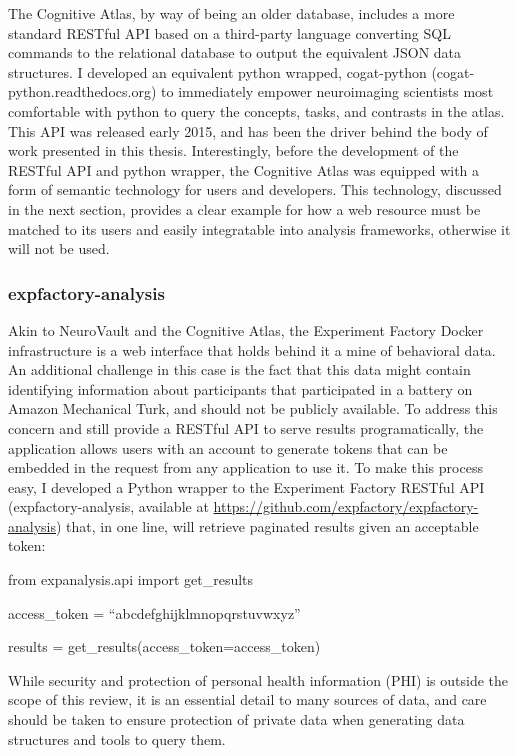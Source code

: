 \documentclass{report}
\begin{document}
The Cognitive Atlas, by way of being an older database, includes a more
standard RESTful API based on a third-party language converting SQL
commands to the relational database to output the equivalent JSON data
structures. I developed an equivalent python wrapped, cogat-python
(cogat-python.readthedocs.org) to immediately empower neuroimaging
scientists most comfortable with python to query the concepts, tasks,
and contrasts in the atlas. This API was released early 2015, and has
been the driver behind the body of work presented in this thesis.
Interestingly, before the development of the RESTful API and python
wrapper, the Cognitive Atlas was equipped with a form of semantic
technology for users and developers. This technology, discussed in the
next section, provides a clear example for how a web resource must be
matched to its users and easily integratable into analysis frameworks,
otherwise it will not be used.

\subsubsection{expfactory-analysis}

Akin to NeuroVault and the Cognitive Atlas, the Experiment Factory
Docker infrastructure is a web interface that holds behind it a mine of
behavioral data. An additional challenge in this case is the fact that
this data might contain identifying information about participants that
participated in a battery on Amazon Mechanical Turk, and should not be
publicly available. To address this concern and still provide a RESTful
API to serve results programatically, the application allows users with
an account to generate tokens that can be embedded in the request from
any application to use it. To make this process easy, I developed a
Python wrapper to the Experiment Factory RESTful API
(expfactory-analysis, available at
\href{https://github.com/expfactory/expfactory-analysis}{https://github.com/expfactory/expfactory-analysis}) that, in one line,
will retrieve paginated results given an acceptable token:

from expanalysis.api import get\_results

access\_token = ``abcdefghijklmnopqrstuvwxyz''

results = get\_results(access\_token=access\_token)

While security and protection of personal health information (PHI) is
outside the scope of this review, it is an essential detail to many
sources of data, and care should be taken to ensure protection of
private data when generating data structures and tools to query them.
\end{document}

